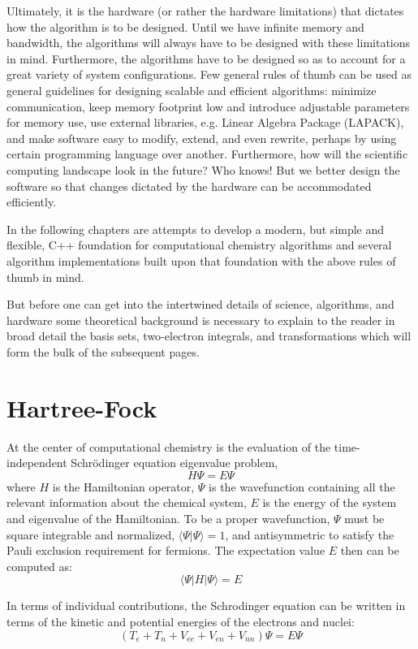 \documentclass[12pt]{book} \usepackage[margin=1in]{geometry}
\newcommand{\bra}[1]{\langle #1|}
\newcommand{\ket}[1]{|#1\rangle}
\newcommand{\braket}[2]{\langle #1|#2\rangle}
\begin{document}
Ultimately, it is the hardware (or rather the hardware limitations)
that dictates how the algorithm is to be designed.  Until we have
infinite memory and bandwidth, the algorithms will always have to be
designed with these limitations in mind.  Furthermore, the algorithms
have to be designed so as to account for a great variety of
system configurations.  Few general rules of thumb can be used as
general guidelines for designing scalable and efficient algorithms:
minimize communication, keep memory footprint low and introduce
adjustable parameters for memory use, use external libraries, e.g.
Linear Algebra Package \cite{lapack} (LAPACK), and make software easy
to modify, extend, and even rewrite, perhaps by using certain
programming language over another.  Furthermore, how will the
scientific computing landscape look in the future?  Who knows!  But we
better design the software so that changes dictated by the hardware
can be accommodated efficiently.

In the following chapters are attempts
to develop a modern, but simple and flexible, C++ foundation for
computational chemistry algorithms and several algorithm
implementations built upon that foundation with the above rules of
thumb in mind.

But before one can get into the intertwined details of science,
algorithms, and hardware some theoretical background is necessary to
explain to the reader in broad detail the basis sets, two-electron
integrals, and transformations which will form the bulk of the
subsequent pages.

\section{Hartree-Fock}
At the center of computational chemistry is the evaluation of the
time-independent Schrödinger equation eigenvalue problem,
$$ H\Psi = E\Psi $$
where $H$ is the Hamiltonian operator, $\Psi$ is the wavefunction
containing all the relevant information about the chemical system, $E$
is the energy of the system and eigenvalue of the Hamiltonian.  To be
a proper wavefunction, $\Psi$ must be square integrable and
normalized, $\braket{\Psi}{\Psi} = 1$, and antisymmetric to satisfy
the Pauli exclusion requirement for fermions.  The expectation value
$E$ then can be computed as:
$$\bra{\Psi} H \ket{\Psi} = E$$

In terms of individual contributions, the Schrodinger equation can be
written in terms of the kinetic and potential energies of the electrons and nuclei:
$$(T_{e} + T_{n} + V_{ee} + V_{en} + V_{nn})\Psi = E\Psi$$
\end{document}
